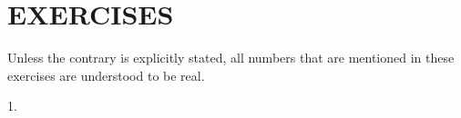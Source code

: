 \section*{EXERCISES}

Unless the contrary is explicitly stated, all numbers that are mentioned in these exercises are understood to be real.

1.